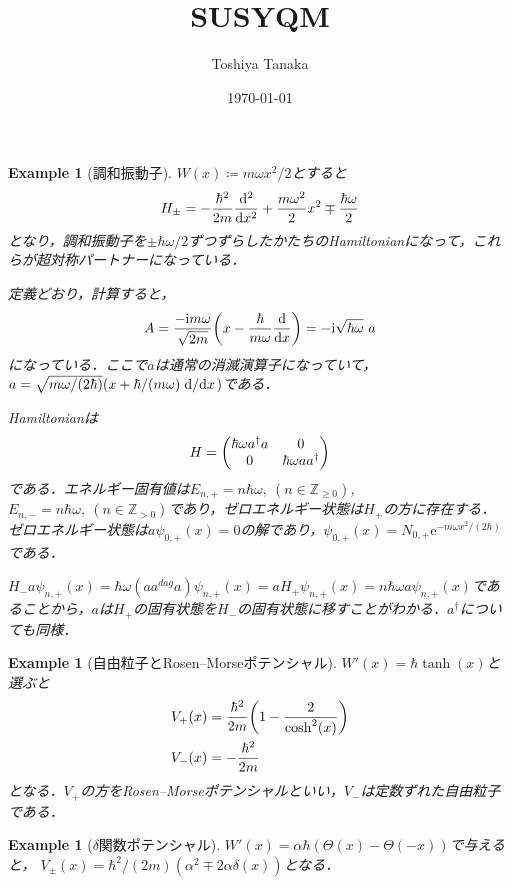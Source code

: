 \documentclass[english, dvipdfmx, a4paper]{jsarticle}
\title{SUSYQM}
\author{Toshiya Tanaka}
\date{\today}
\theoremstyle{break}
\newtheorem{eg}[thm]{Example}
\newcommand{\Z}{\mathbb{Z}}
\renewcommand{\i}{\mathrm{i}}
\newcommand{\e}{\mathrm{e}}
\begin{document}
	\begin{eg}[調和振動子]
		$W(x)\coloneqq m\omega x^2/2$とすると
		\begin{equation}
			H_{\pm} = -\frac{\hbar^2}{2m}\dv[2]{}{x} + \frac{m\omega^2}{2}x^2 \mp \frac{\hbar\omega}{2}
		\end{equation}
		となり，調和振動子を$\pm\hbar\omega/2$ずつずらしたかたちのHamiltonianになって，これらが超対称パートナーになっている．

		定義どおり，計算すると，
		\begin{equation}
			A = \frac{-\i m\omega}{\sqrt{2m}}\qty(x - \frac{\hbar}{m\omega}\dv{}{x}) = -\i \sqrt{\hbar\omega}\ a
		\end{equation}
		になっている．ここで$a$は通常の消滅演算子になっていて，$a = \sqrt{m\omega/(2\hbar)}(x + \hbar/(m\omega)\dv*{}{x})$である．

		Hamiltonianは
		\begin{equation}
			H = 
			\mqty(\hbar\omega a^{\dag}a & 0 \\
			0 & \hbar\omega aa^{\dag})
		\end{equation}
		である．エネルギー固有値は$E_{n, +} = n\hbar\omega,\ (n\in\Z_{\geq0})$, $E_{n, -} = n\hbar\omega,\ (n\in\Z_{>0})$であり，ゼロエネルギー状態は$H_+$の方に存在する．
		ゼロエネルギー状態は$a\psi_{0, +}(x) = 0$の解であり，$\psi_{0, +}(x) = N_{0, +}\e^{-m\omega x^2/(2\hbar)}$である．


		$H_{-}a\psi_{n, +}(x) = \hbar\omega(aa^{dag}a)\psi_{n, +}(x) = aH_+\psi_{n, +}(x) = n\hbar\omega a\psi_{n, +}(x)$であることから，$a$は$H_+$の固有状態を$H_-$の固有状態に移すことがわかる．$a^{\dag}$についても同様．
	\end{eg}
	
	\begin{eg}[自由粒子とRosen--Morseポテンシャル]
		$W'(x) = \hbar\tanh(x)$と選ぶと
		\begin{align}
			V_+(x) &= \frac{\hbar^2}{2m}\qty(1-\frac{2}{\cosh^2(x)})\\
			V_-(x) &= -\frac{\hbar^2}{2m}
		\end{align}
		となる．$V_+$の方をRosen--Morseポテンシャルといい，$V_-$は定数ずれた自由粒子である．
	\end{eg}

	\begin{eg}[$\delta$関数ポテンシャル]
		$W'(x) = \alpha\hbar(\Theta(x) - \Theta(-x))$で与えると，
		$V_{\pm}(x) = \hbar^2/(2m)(\alpha^2 \mp 2\alpha\delta(x))$となる．
	\end{eg}
\end{document}
